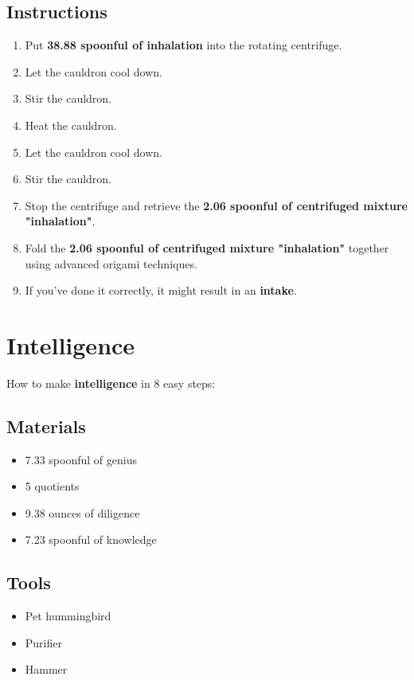 \documentclass{article}
\begin{document}
\subsection{Instructions}\begin{enumerate}
\item 
Put \textbf{38.88 spoonful of inhalation} into the rotating centrifuge.
\item 
Let the cauldron cool down.
\item 
Stir the cauldron.
\item 
Heat the cauldron.
\item 
Let the cauldron cool down.
\item 
Stir the cauldron.
\item 
Stop the centrifuge and retrieve the \textbf{2.06 spoonful of centrifuged mixture "inhalation"}.
\item 
Fold the \textbf{2.06 spoonful of centrifuged mixture "inhalation"} together using advanced origami techniques.
\item 
If you've done it correctly, it might result in an \textbf{intake}.
\end{enumerate}
\newpage
\section{Intelligence}How to make \textbf{intelligence} in 8 easy steps:

\subsection{Materials}\begin{itemize}
\item 
7.33 spoonful of genius
\item 
5 quotients
\item 
9.38 ounces of diligence
\item 
7.23 spoonful of knowledge
\end{itemize}
\subsection{Tools}\begin{itemize}
\item 
Pet hummingbird
\item 
Purifier
\item 
Hammer
\end{itemize}
\end{document}
